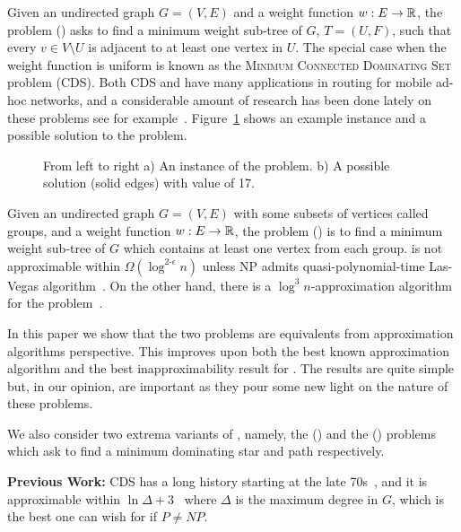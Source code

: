 Given an undirected graph $G = (V, E)$ and a weight function $w:E \to \mathbb{R}$, 
the \Problem{} problem (\Prob{}) asks to find a minimum weight sub-tree of $G$, 
$T = (U, F)$, such that every $v \in V \setminus U$ is adjacent to at least one 
vertex in $U$.
The special case when the weight function is uniform is known as the 
\textsc{Minimum Connected Dominating Set} problem (CDS). 
Both CDS and \Prob{} have many applications in routing
for mobile ad-hoc networks, 
and a considerable amount of research has been done lately on these problems
see for example~\cite{%
shin2010approximation%
,cheng2003polynomial%
,das1997routing%
,adasme2016models%
,adasme2017minimum%
,rossi2018properties%
,adasme2018improved%
,alvarez2018exact%
,dravzic2017metaheuristic%
,shi2011dominating%
}.
Figure~\ref{fig:problem} shows an example instance and a possible solution to the problem. 

\begin{figure}
\begin{center}

\end{center}
\caption{\label{fig:problem}
From left to right
a) An instance of the \Problem{} problem.
b) A possible solution (solid edges) with value of 17.
}
\end{figure}

Given an undirected graph $G = (V, E)$ with some subsets of vertices called groups,
and a weight function $w:E \to \mathbb{R}$,
the \ProblemGroup{} problem (\ProbGroup{}) is to find a minimum weight sub-tree
of $G$ which contains at least one vertex from each group.
\ProbGroup{} is not approximable within $ \Omega(\log^{2\textbf{-}\epsilon}n)$
unless NP admits quasi-polynomial-time Las-Vegas
algorithm~\cite{halperin2003polylogarithmic}.
On the other hand, there is a $\log^3 n$-approximation algorithm for the 
problem~\cite{garg2000polylogarithmic}.

In this paper we show that the two problems are equivalents 
from approximation algorithms perspective.
This improves upon both the best known approximation algorithm and the best 
inapproximability result for \Prob{}.
The results are quite simple but, in our opinion, 
are important as they pour some new light on the nature of these problems.
 
We also consider two extrema variants of \Prob{}, namely,
the \ProblemStar{} (\ProbStar{}) and the \ProblemPath{} (\ProbPath{}) 
problems which ask to find a minimum dominating star and path respectively.  

\textbf{Previous Work:}
CDS has a long history starting at the late 70s~\cite{sampathkumar1979connected},
and it is approximable within $\ln\Delta + 3$~\cite{guha1998approximation} 
where $\Delta$ is the maximum degree in $G$,
which is the best one can wish for if $P \neq NP$. 

